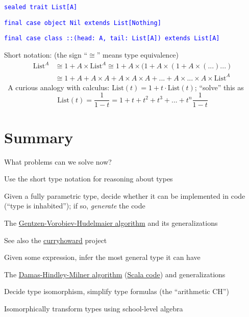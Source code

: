 \texttt{\textcolor{blue}{\footnotesize{}sealed trait List{[}A{]}}}{\footnotesize\par}

\texttt{\textcolor{blue}{\footnotesize{}final case object Nil extends
List{[}Nothing{]}}}{\footnotesize\par}

\texttt{\textcolor{blue}{\footnotesize{}final case class ::(head: A,
tail: List{[}A{]}) extends List{[}A{]}}}{\footnotesize\par}

Short notation: (the sign ``$\cong$'' means type equivalence)\texttt{\footnotesize{}
\begin{align*}
\text{List}^{A} & \cong1+A\times\text{List}^{A}\cong1+A\times(1+A\times(1+A\times(...)...)\\
 & \cong1+A+A\times A+A\times A\times A+...+A\times...\times A\times\text{List}^{A}
\end{align*}
}A curious analogy with calculus: $\text{List}(t)=1+t\cdot\text{List}(t)$;
``solve'' this as 
\[
\text{List}(t)=\frac{1}{1-t}=1+t+t^{2}+t^{3}+...+t^{n}\frac{1}{1-t}
\]


\section{Summary}

What problems can we solve now?

Use the short type notation for reasoning about types

Given a fully parametric type, decide whether it can be implemented
in code (``type is inhabited''); if so, \emph{generate} the code

The \href{http://apt13.unibe.ch/slides/Dyckhoff.pdf}{Gentzen-Vorobiev-Hudelmaier algorithm}
and its generalizations

See also the \href{https://github.com/Chymyst/curryhoward}{curryhoward}
project

Given some expression, infer the most general type it can have

The \href{https://en.wikipedia.org/wiki/Hindley\%E2\%80\%93Milner_type_system}{Damas-Hindley-Milner algorithm}
(\href{http://dysphoria.net/2009/06/28/hindley-milner-type-inference-in-scala/}{Scala code})
and generalizations

Decide type isomorphism, simplify type formulas (the ``arithmetic
CH'')

Isomorphically transform types using school-level algebra

